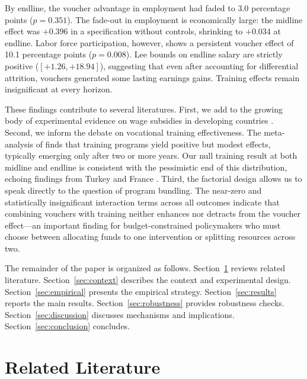\documentclass[12pt]{article}
\begin{document}
By endline, the voucher advantage in employment had faded to 3.0 percentage points ($p = 0.351$). The fade-out in employment is economically large: the midline effect was $+0.396$ in a specification without controls, shrinking to $+0.034$ at endline. Labor force participation, however, shows a persistent voucher effect of 10.1 percentage points ($p = 0.008$). Lee bounds on endline salary are strictly positive ($[+1.26, +18.94]$), suggesting that even after accounting for differential attrition, vouchers generated some lasting earnings gains. Training effects remain insignificant at every horizon.

These findings contribute to several literatures. First, we add to the growing body of experimental evidence on wage subsidies in developing countries \citep{galasso2004wage, levinsohn2014subsidizing, groh2016wage}. Second, we inform the debate on vocational training effectiveness. The meta-analysis of \citet{card2018what} finds that training programs yield positive but modest effects, typically emerging only after two or more years. Our null training result at both midline and endline is consistent with the pessimistic end of this distribution, echoing findings from Turkey \citep{hirshleifer2016impact} and France \citep{crepon2013labor}. Third, the factorial design allows us to speak directly to the question of program bundling. The near-zero and statistically insignificant interaction terms across all outcomes indicate that combining vouchers with training neither enhances nor detracts from the voucher effect---an important finding for budget-constrained policymakers who must choose between allocating funds to one intervention or splitting resources across two.

The remainder of the paper is organized as follows. Section~\ref{sec:literature} reviews related literature. Section~\ref{sec:context} describes the context and experimental design. Section~\ref{sec:empirical} presents the empirical strategy. Section~\ref{sec:results} reports the main results. Section~\ref{sec:robustness} provides robustness checks. Section~\ref{sec:discussion} discusses mechanisms and implications. Section~\ref{sec:conclusion} concludes.


\section{Related Literature}\label{sec:literature}
\end{document}
